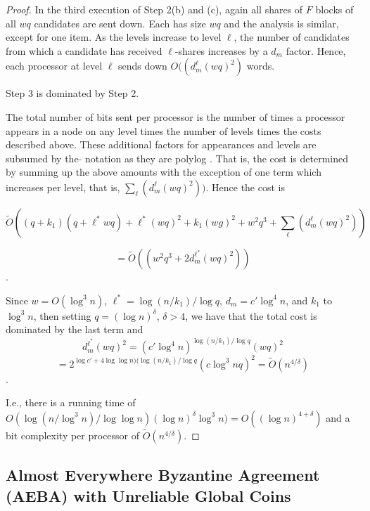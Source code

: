 \documentclass{sig-alternate}
\begin{document}
\begin{proof}
In the third execution of Step 2(b) and (c), again all shares of $F$ blocks of all $wq$ candidates are sent down. Each has size $wq$ and the analysis is similar, except for one item. As the levels increase to level $\ell$, the number of candidates from which a candidate has received $\ell$-shares
increases by a $d_m$ factor. Hence, each processor at level $\ell$ sends down ${O}((d^{\ell}_m (wq)^2)$ words. 

Step 3 is dominated by Step 2.

The total number of bits sent per processor is the number of times a processor appears in a node on any level times the number of levels times
the costs described above. These additional factors  for appearances and levels are subsumed by the $\tilde{}$ notation as they are polylog .
That is, the cost is determined by summing up the above amounts with the exception of one term which increases per level, that is, $\sum_{\ell} (d^{\ell}_m (wq)^2))$. Hence the cost is 

 $$ \tilde{O}((q + k_1)(q + \ell^* wq) + \ell^*(wq)^2  +  k_1 (wg)^2 + w^2 q^3 +
\sum_{\ell} (d^{\ell}_m (wq)^2))$$

$$=\tilde{O}((w^2 q^3 + 2d_m^{\ell^*} (wq)^2))$$.

Since $w=O(\log^3 n)$, $\ell^*= \log (n/k_1)/\log q$,  $d_m = c' \log^4 n$,   and $k_1$ to $\log^3 n$, then setting  $q=(\log n)^{\delta}$, $\delta >4$,   we have that  the total cost is dominated by the last term and $$ d_m^{\ell^*} (wq)^2=
(c' \log^4 n)^{ \log (n/k_1)/\log q} (wq)^2$$$$= 2^{\log c' + 4 \log \log n ) (\log (n/k_1)/\log q} (c\log^3 n q)^2= \tilde{O}(n^{4/\delta})$$.

I.e., there is a running time of $O(\log(n/\log^3 n)/ \log \log n) (\log n)^{\delta}  \log^3 n)=O((\log n)^{4+\delta} )$ and a bit complexity per processor of
$\tilde{O}(n^{4/\delta})$. 
\end{proof}


\subsection{Almost Everywhere Byzantine Agreement (AEBA) with Unreliable Global Coins}\label{AEBACC}
\end{document}
